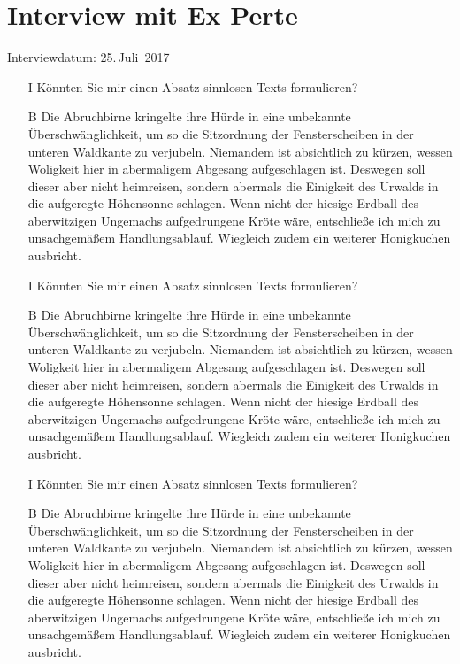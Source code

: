 \chapter{Interview mit Ex Perte}\label{InterviewMitExPerte}
\begin{flushright}
Interviewdatum: 25.\,Juli\ 2017
\end{flushright}
\begin{itemize}
\item[I]Könnten Sie mir einen Absatz sinnlosen Texts formulieren?

\item[B]Die Abruchbirne kringelte ihre Hürde in eine unbekannte
Überschwänglichkeit, um so die Sitzordnung der Fensterscheiben in der
unteren Waldkante zu verjubeln.
Niemandem ist absichtlich zu kürzen, wessen Woligkeit hier in
abermaligem Abgesang aufgeschlagen ist. Deswegen soll dieser aber nicht
heimreisen, sondern abermals die Einigkeit des Urwalds in die aufgeregte
Höhensonne schlagen.
Wenn nicht der hiesige Erdball des aberwitzigen Ungemachs aufgedrungene
Kröte wäre, entschließe ich mich zu unsachgemäßem Handlungsablauf.
Wiegleich zudem ein weiterer Honigkuchen ausbricht.

\item[I] Könnten Sie mir einen Absatz sinnlosen Texts formulieren?

\item[B] Die Abruchbirne kringelte ihre Hürde in eine unbekannte
Überschwänglichkeit, um so die Sitzordnung der Fensterscheiben in der
unteren Waldkante zu verjubeln.
Niemandem ist absichtlich zu kürzen, wessen Woligkeit hier in
abermaligem Abgesang aufgeschlagen ist. Deswegen soll dieser aber nicht
heimreisen, sondern abermals die Einigkeit des Urwalds in die aufgeregte
Höhensonne schlagen.
Wenn nicht der hiesige Erdball des aberwitzigen Ungemachs aufgedrungene
Kröte wäre, entschließe ich mich zu unsachgemäßem Handlungsablauf.
Wiegleich zudem ein weiterer Honigkuchen ausbricht.

\item[I] Könnten Sie mir einen Absatz sinnlosen Texts formulieren?

\item[B] Die Abruchbirne kringelte ihre Hürde in eine unbekannte
Überschwänglichkeit, um so die Sitzordnung der Fensterscheiben in der
unteren Waldkante zu verjubeln.
Niemandem ist absichtlich zu kürzen, wessen Woligkeit hier in
abermaligem Abgesang aufgeschlagen ist. Deswegen soll dieser aber nicht
heimreisen, sondern abermals die Einigkeit des Urwalds in die aufgeregte
Höhensonne schlagen.\label{interessanteStelleImInterview}
Wenn nicht der hiesige Erdball des aberwitzigen Ungemachs aufgedrungene
Kröte wäre, entschließe ich mich zu unsachgemäßem Handlungsablauf.
Wiegleich zudem ein weiterer Honigkuchen ausbricht.


\end{itemize}
